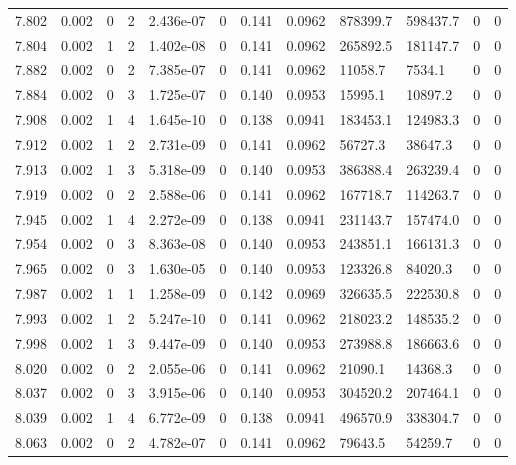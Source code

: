 \documentclass[preview]{standalone}
\begin{document}
{{{{{{{{{{{\begin{tabular}{L{1.2cm}C{1.2cm} C{0.3cm}C{0.5cm} C{1.4cm}C{1.4cm} C{1.4cm}C{1.4cm} C{1.6cm}C{1.6cm} C{1.6cm}C{1.6cm}}
  7.802  &  0.002  & 0     &  2 &  2.436e-07  & 0  &  0.141&   0.0962& 878399.7 & 598437.7   &  0 & 0  \\ 
  7.804  &  0.002  & 1     &  2 &  1.402e-08  & 0  &  0.141&   0.0962& 265892.5 & 181147.7   &  0 & 0  \\ 
  7.882  &  0.002  & 0     &  2 &  7.385e-07  & 0  &  0.141&   0.0962& 11058.7 & 7534.1   &  0 & 0  \\ 
  7.884  &  0.002  & 0     &  3 &  1.725e-07  & 0  &  0.140&   0.0953& 15995.1 & 10897.2   &  0 & 0  \\ 
  7.908  &  0.002  & 1     &  4 &  1.645e-10  & 0  &  0.138&   0.0941& 183453.1 & 124983.3   &  0 & 0  \\ 
  7.912  &  0.002  & 1     &  2 &  2.731e-09  & 0  &  0.141&   0.0962& 56727.3 & 38647.3   &  0 & 0  \\ 
  7.913  &  0.002  & 1     &  3 &  5.318e-09  & 0  &  0.140&   0.0953& 386388.4 & 263239.4   &  0 & 0  \\ 
  7.919  &  0.002  & 0     &  2 &  2.588e-06  & 0  &  0.141&   0.0962& 167718.7 & 114263.7   &  0 & 0  \\ 
  7.945  &  0.002  & 1     &  4 &  2.272e-09  & 0  &  0.138&   0.0941& 231143.7 & 157474.0   &  0 & 0  \\ 
  7.954  &  0.002  & 0     &  3 &  8.363e-08  & 0  &  0.140&   0.0953& 243851.1 & 166131.3   &  0 & 0  \\ 
  7.965  &  0.002  & 0     &  3 &  1.630e-05  & 0  &  0.140&   0.0953& 123326.8 & 84020.3   &  0 & 0  \\ 
  7.987  &  0.002  & 1     &  1 &  1.258e-09  & 0  &  0.142&   0.0969& 326635.5 & 222530.8   &  0 & 0  \\ 
  7.993  &  0.002  & 1     &  2 &  5.247e-10  & 0  &  0.141&   0.0962& 218023.2 & 148535.2   &  0 & 0  \\ 
  7.998  &  0.002  & 1     &  3 &  9.447e-09  & 0  &  0.140&   0.0953& 273988.8 & 186663.6   &  0 & 0  \\ 
  8.020  &  0.002  & 0     &  2 &  2.055e-06  & 0  &  0.141&   0.0962& 21090.1 & 14368.3   &  0 & 0  \\ 
  8.037  &  0.002  & 0     &  3 &  3.915e-06  & 0  &  0.140&   0.0953& 304520.2 & 207464.1   &  0 & 0  \\ 
  8.039  &  0.002  & 1     &  4 &  6.772e-09  & 0  &  0.138&   0.0941& 496570.9 & 338304.7   &  0 & 0  \\ 
  8.063  &  0.002  & 0     &  2 &  4.782e-07  & 0  &  0.141&   0.0962& 79643.5 & 54259.7   &  0 & 0  \\ 

\end{tabular}}}}}}}}}}}}
\end{document}
